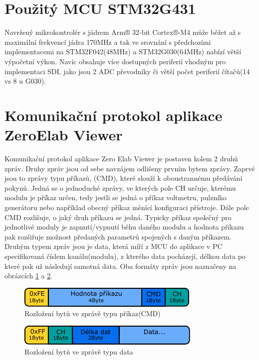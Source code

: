 \section{Použitý MCU STM32G431}
Navržený mikrokontrolér s jádrem Arm® 32-bit Cortex®-M4 může běžet až s maximální frekvencí jádra 170MHz a tak ve srovnání s předchozími implementacemi na STM32F042(48MHz) a STM32G030(64MHz) nabízí větší výpočetní výkon. Navíc obsahuje více dostupných periferií vhodným pro implementaci SDI, jako jsou 2 ADC převodníky či větší počet periferií čítačů(14 vs 8 u G030).

\section{Komunikační protokol aplikace ZeroElab Viewer }
Komunikační protokol aplikace Zero Elab Viewer je postaven kolem 2 druhů zpráv. Druhy zpráv jsou od sebe navzájem odlišeny prvním bytem zprávy. Zaprvé jsou to zprávy typu příkazů, (CMD), které slouží k oboustrannému předávání pokynů. Jedná se o jednoduché zprávy, ve kterých pole CH určuje, kterému modulu je příkaz určen, tedy jestli se jedná o příkaz voltmetru, pulzního generátoru nebo například obecný příkaz měnící konfiguraci přístroje. Dále pole CMD rozlišuje, o jaký druh příkazu se jedná. Typicky příkaz společný pro jednotlivé moduly je zapnutí/vypnutí běhu daného modulu a hodnota příkazu pak rozšiřuje možnost předaných parametrů spojených s daným příkazem. Druhým typem zpráv jsou je data, která míří z MCU do aplikace v PC specifikovaná číslem kanálu(modulu), z kterého data pocházejí, délkou data po které pak už následují samotná data. Oba formáty zpráv jsou naznačeny na obrázcích \ref{fig:communicationcmd} a \ref{fig:communicationdata}. 
 
\begin{figure}[H]
	\centering
	\includegraphics[width=0.7\linewidth]{Figs/Diagrams/SVG/CommunicationCMD.pdf}
	\caption{Rozložení bytů ve zprávě typu příkaz(CMD)}
	\label{fig:communicationcmd}
\end{figure}

\begin{figure}[H]
	\centering
	\includegraphics[width=0.7\linewidth]{Figs/Diagrams/SVG/CommunicationDATA.pdf}
	\caption{Rozložení bytů ve zprávě typu data}
	\label{fig:communicationdata}
\end{figure}

